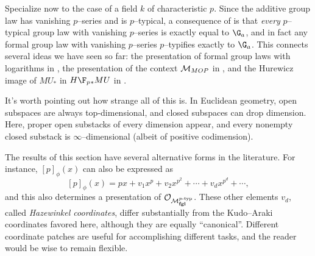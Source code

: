 \begin{remark}
Specialize now to the case of a field $k$ of characteristic $p$.  Since the additive group law has vanishing $p$--series and is $p$--typical, a consequence of  is that \emph{every} $p$--typical group law with vanishing $p$--series is exactly equal to $\G_a$, and in fact any formal group law with vanishing $p$--series $p$--typifies exactly to $\G_a$.  This connects several ideas we have seen so far: the presentation of formal group laws with logarithms in , the presentation of the context $\mathcal{M}_{MOP}$ in , and the Hurewicz image of $MU_*$ in $H\F_p{}_* MU$ in .
\end{remark}

\begin{remark}
It's worth pointing out how strange all of this is. In Euclidean geometry, open subspaces are always top-dimensional, and closed subspaces can drop dimension.  Here, proper open substacks of every dimension appear, and every nonempty closed substack is $\infty$--dimensional (albeit of positive codimension).
\end{remark}

\begin{remark}
The results of this section have several alternative forms in the literature.  For instance, $[p]_\phi(x)$ can also be expressed as \[[p]_\phi(x) = px + v_1 x^p + v_2 x^{p^2} + \cdots + v_d x^{p^d} + \cdots,\] and this also determines a presentation of $\mathcal{O}_{\mathcal{M}_{\mathbf{fgl}}^{p\text{-}\mathrm{typ}}}$.  These other elements $v_d$, called \textit{Hazewinkel coordinates}, differ substantially from the Kudo--Araki coordinates favored here, although they are equally ``canonical''.  Different coordinate patches are useful for accomplishing different tasks, and the reader would be wise to remain flexible.
\end{remark}


